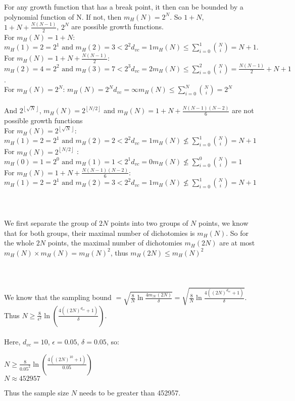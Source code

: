 \documentclass[12pt]{article}
\begin{document}
 \\\\
\indent For any growth function that has a break point, it then can be bounded by a polynomial function of N. If not, then $m_H(N) = 2^N$. So $1+N$, $1+N+\frac{N(N-1)}{2}$, $2^N$ are possible growth functions. \\
 For $m_H(N) = 1+N$: $m_H(1) = 2=2^1 \mbox{ and } m_H(2) = 3 < 2^2 d_{vc} = 1  m_H(N) \leq \sum_{i = 0}^{1}{N\choose i} = N+1$. \\ For $m_H(N) =1+N+\frac{N(N-1)}{2}$:
$m_H(2) = 4=2^2 \mbox{ and } m_H(3) = 7 < 2^3 d_{vc} = 2 m_H(N) \leq \sum_{i = 0}^{2}{N\choose i} = \frac{N(N-1)}{2}+N+1$. \\ For $m_H(N) =2^N$: $m_H(N) = 2^N d_{vc} = \infty m_H(N) \leq \sum_{i = 0}^{N}{N\choose i} = 2^N$\\\\
\indent And $2^{\left\lfloor{\sqrt{N}}\right\rfloor}$, $m_H(N) =2^{\left\lfloor{N/2}\right\rfloor}$ and $m_H(N) =1+N+\frac{N(N-1)(N-2)}{6}$ are not possible growth functions\\
For $m_H(N) =2^{\left\lfloor{\sqrt{N}}\right\rfloor}$: $m_H(1) = 2=2^1 \mbox{ and } m_H(2) = 2 < 2^2 d_{vc} = 1 m_H(N) \nleq \sum_{i = 0}^{1}{N\choose i} = N+1$\\
For $\displaystyle m_H(N) =2^{\left\lfloor{N/2}\right\rfloor}$ : $m_H(0) = 1=2^0 \mbox{ and } m_H(1) = 1 < 2^1 d_{vc} = 0 m_H(N) \nleq \sum_{i = 0}^{0}{N\choose i} = 1$\\
For $m_H(N) =1+N+\frac{N(N-1)(N-2)}{6}$:  $m_H(1) = 2=2^1 \mbox{ and } m_H(2) = 3 < 2^2 d_{vc} = 1 m_H(N) \nleq \sum_{i = 0}^{1}{N\choose i} = N+1$\\\\

 \\\\
\indent We first separate the group of $2N$ points into two groups of $N$ points, we know that for both groups, their maximal number of dichotomies is $m_H(N)$. So for the whole $2N$ points, the maximal number of dichotomies $m_H(2N)$ are at most $m_H(N) \times m_H(N) = m_H(N)^2$, thus $m_H(2N) \leq m_H(N)^2$\\\\

 \\\\
\indent We know that the sampling bound $\displaystyle = \sqrt{\frac{8}{N}\ln\frac{4m_\mathcal{H}(2N)}{\delta}} = \sqrt{\frac{8}{N}\ln\frac{4((2N)^{d_{vc}}+1)}{\delta}}$.\\ Thus $\displaystyle N\geq \frac{8}{\epsilon^2}\ln\left(\frac{4((2N)^{d_{vc}}+1)}{\delta}\right)$.\\\\ Here, $d_{vc} = 10$, $\epsilon = 0.05$, $\delta = 0.05$, so: \begin{center}$\displaystyle N \geq \frac{8}{0.05^2}\ln\left(\frac{4((2N)^{10}+1)}{0.05}\right)$\\$N \approx 452957$\\
\end{center}
\indent Thus the sample size $N$ needs to be greater than 452957.
\end{document}
